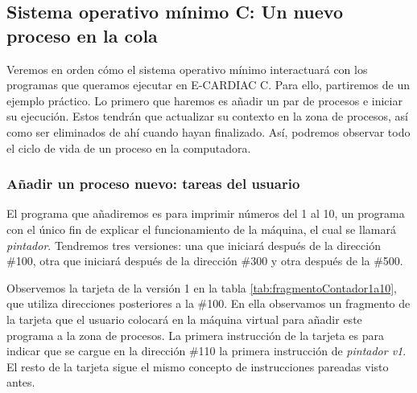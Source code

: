 \documentclass[letterpaper,12pt,oneside]{book}
\begin{document}
        \subsection{Sistema operativo mínimo C: Un nuevo proceso en la cola}
        
        Veremos en orden cómo el sistema operativo mínimo interactuará con los programas que queramos ejecutar en E-CARDIAC C. Para ello, 
        partiremos
		de un ejemplo práctico. Lo primero que haremos es añadir un par de procesos e iniciar su ejecución. Estos tendrán que actualizar
		su contexto en la zona de procesos, así como ser eliminados de ahí cuando hayan finalizado. Así, podremos observar todo
		el ciclo de vida de un proceso en la computadora.
  
		\subsubsection{Añadir un proceso nuevo: tareas del usuario }
		
			
		El programa que añadiremos es para imprimir números del 1 al 10, un programa con el 
		único fin de explicar el funcionamiento de la máquina, el cual se llamará \textit{pintador}. Tendremos tres versiones: 
		una que 
		iniciará después de la 		
		dirección \#100, otra que iniciará
		después de la dirección \#300 y otra después de la \#500. 
		
		Observemos la tarjeta de la versión 1 en la tabla \ref{tab:fragmentoContador1a10}, que utiliza direcciones 
		posteriores a la \#100. En ella observamos 
		un fragmento de la tarjeta que el usuario colocará en la máquina virtual para añadir este programa a la zona de procesos. La primera 
		instrucción de la tarjeta  es para indicar que se cargue 
		en la dirección \#110 la primera instrucción de \textit{pintador v1}. El resto de la tarjeta sigue el mismo concepto de instrucciones pareadas 
		visto antes.
		
\end{document}
